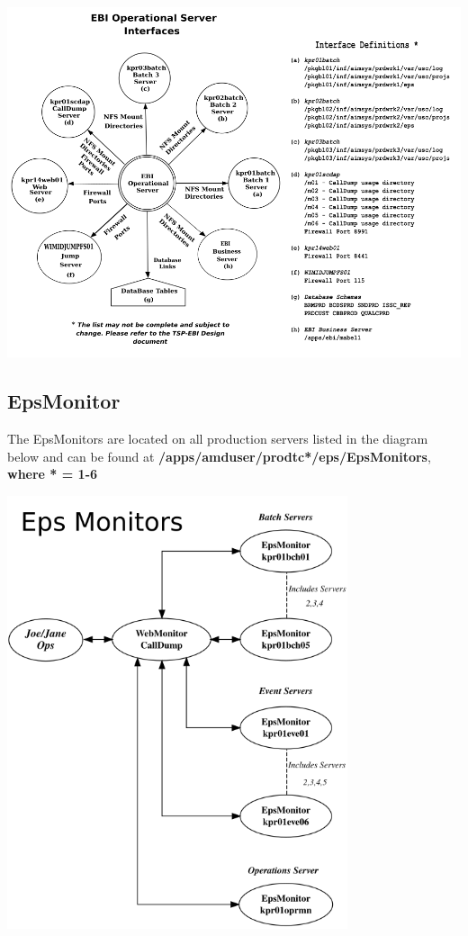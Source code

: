 \documentclass[12pt,twoside]{article}
\begin{document}
\begin{landscape}  
\includegraphics[width=22cm]{Pictures/EBI_Operational_Server.png}


\end{landscape} 
\newpage
\subsection{EpsMonitor}
\label{sec:orgheadline13}
The EpsMonitors are located on all production servers listed in the diagram below and can be found at
\textbf{/apps/amduser/prodtc*/eps/EpsMonitors}, \textbf{where * = 1-6}


\includegraphics[width=10cm]{Pictures/EpsMonitors.png}
\end{document}
